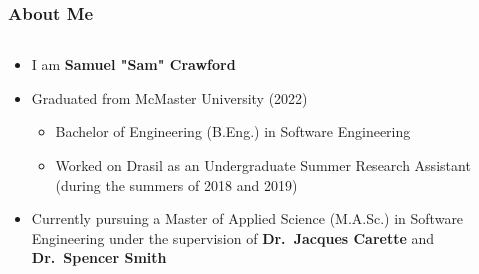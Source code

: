 \documentclass{beamer}
\begin{document}
\begin{frame}
    \frametitle{About Me}
    \begin{columns}[T,onlytextwidth]
        \begin{column}{.675\textwidth}
            \begin{minipage}{\textwidth}
                \begin{itemize}
                    \item I am \textbf{Samuel "Sam" Crawford}
                    \item<2-> Graduated from McMaster University (2022)
                          \begin{itemize}
                              \item Bachelor of Engineering (B.Eng.) in Software Engineering
                              \item Worked on Drasil as an Undergraduate Summer Research Assistant
                                    (during the summers of 2018 and 2019)
                          \end{itemize}
                    \item<3-> Currently pursuing a Master of Applied Science (M.A.Sc.) in Software
                          Engineering under the supervision of \textbf{Dr.~Jacques Carette} and \textbf{Dr.~Spencer Smith}
                \end{itemize}
            \end{minipage}
        \end{column}
        \begin{column}{.3\textwidth}
        \end{column}
    \end{columns}
\end{frame}
\end{document}
